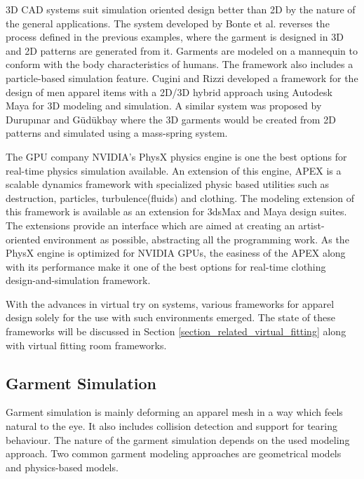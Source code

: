  3D CAD systems suit simulation oriented design better than 2D by the nature of the general applications. The system developed by Bonte et al.\cite{Bonte2002} reverses the process
 defined in the previous examples, where the garment is designed in 3D and 2D patterns are generated from it. Garments are modeled on a mannequin to conform with the body characteristics
 of humans. The framework also includes a particle-based simulation feature. Cugini and Rizzi developed a framework\cite{Cugini2002} for the design of men apparel items with a 2D/3D 
 hybrid approach using Autodesk Maya\cite{Autodesk2013} for 3D modeling and simulation. A similar system was proposed by Durup{\i}nar and G{\"u}d{\"u}kbay\cite{Durupinar2007} where the 3D garments
 would be created from 2D patterns and simulated using a mass-spring system.
 
 The GPU company NVIDIA's PhysX physics engine is one the best options for real-time physics simulation available\cite{WikiPhysx2012}. An extension of this engine, APEX is a scalable 
 dynamics framework with specialized physic based utilities such as destruction, particles, turbulence(fluids) and clothing\cite{Nvidia2013}. The modeling extension of this framework
 is available as an extension for 3dsMax\cite{Autodesk3DS2013} and Maya\cite{Autodesk2013} design suites. The extensions provide an interface which are aimed at creating an artist-oriented environment as 
 possible, abstracting all the programming work. As the PhysX engine is optimized for NVIDIA GPUs, the easiness of the APEX along with its performance make it one of the 
 best options for real-time clothing design-and-simulation framework.  
 
 With the advances in virtual try on systems, various frameworks for apparel design solely for the use with such environments emerged. The state of these frameworks will be discussed 
 in Section \ref{section_related_virtual_fitting} along with virtual fitting room frameworks.  
   
\subsection{Garment Simulation}
Garment simulation is mainly deforming an apparel mesh in a way which feels natural to the eye. It also includes collision detection and support for tearing behaviour. The nature of the garment simulation depends on the used modeling approach. 
Two common garment modeling approaches are geometrical models\cite{Weil1986} and physics-based models. 

